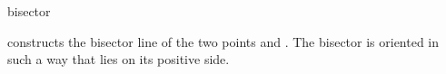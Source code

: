 \begin{ccRefFunction}{bisector}

{constructs the bisector line of the two points  and .
The bisector is oriented in such a way that  lies on its
positive side. }

\end{ccRefFunction}

